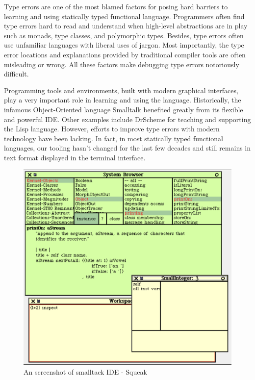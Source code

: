Type errors are one of the most blamed factors for posing hard barriers to learning and using statically typed functional language. Programmers often find type errors hard to read and understand when high-level abstractions are in play such as monads, type classes, and polymorphic types. Besides, type errors often use unfamiliar languages with liberal uses of jargon. Most importantly, the type error locations and explanations provided by traditional compiler tools are often misleading or wrong. All these factors make debugging type errors notoriously difficult.

Programming tools and environments, built with modern graphical interfaces, play a very important role in learning and using the language. Historically, the infamous Object-Oriented language Smalltalk benefited greatly from its flexible and powerful IDE. Other examples include DrScheme for teaching and supporting the Lisp language. However, efforts to improve type errors with modern technology have been lacking. In fact, in most statically typed functional languages, our tooling hasn’t changed for the last few decades and still remains in text format displayed in the terminal interface. 

\begin{figure}[hbt]
  \includegraphics[width=\linewidth]{Smalltalk}
  \caption{
    An screenshot of smalltack IDE - Squeak
    }
\end{figure}


